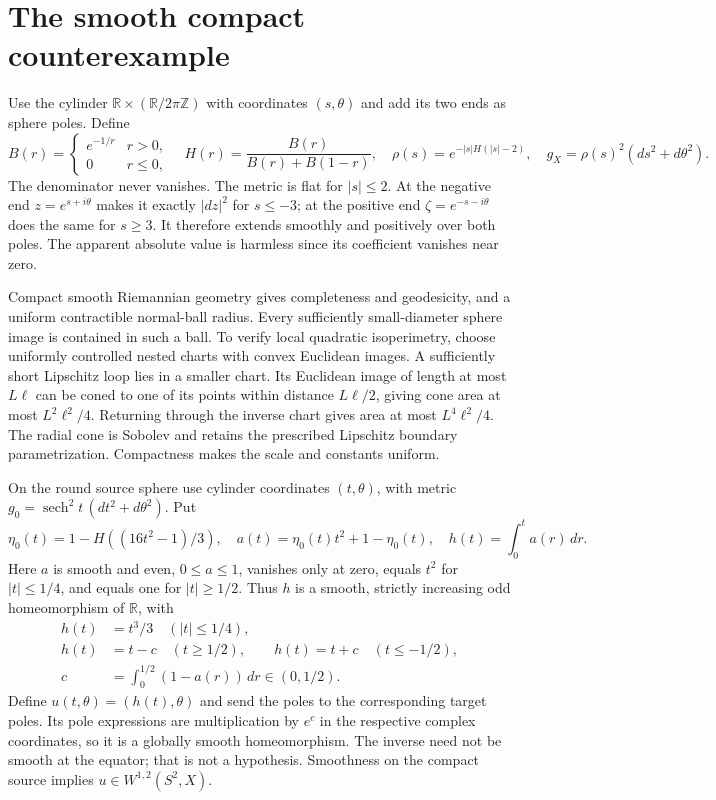 \documentclass[11pt]{article}
\newcommand{\R}{\mathbb R}
\begin{document}
\section{The smooth compact counterexample}
Use the cylinder $\R\times(\R/2\pi\mathbb Z)$ with coordinates $(s,\theta)$
and add its two ends as sphere poles. Define
\[
 B(r)=\begin{cases}e^{-1/r}&r>0,\\0&r\le0,\end{cases}
 \quad H(r)=\frac{B(r)}{B(r)+B(1-r)},\quad
 \rho(s)=e^{-|s|H(|s|-2)},\quad
 g_X=\rho(s)^2(ds^2+d\theta^2).
\]
The denominator never vanishes. The metric is flat for $|s|\le2$. At the
negative end $z=e^{s+i\theta}$ makes it exactly $|dz|^2$ for $s\le-3$;
at the positive end $\zeta=e^{-s-i\theta}$ does the same for $s\ge3$.
It therefore extends smoothly and positively over both poles. The apparent
absolute value is harmless since its coefficient vanishes near zero.

Compact smooth Riemannian geometry gives completeness and geodesicity, and a
uniform contractible normal-ball radius. Every sufficiently small-diameter
sphere image is contained in such a ball. To verify local quadratic isoperimetry,
choose uniformly controlled nested charts with convex Euclidean images.
A sufficiently short Lipschitz loop lies in a smaller chart. Its Euclidean
image of length at most $L\ell$ can be coned to one of its points within
distance $L\ell/2$, giving cone area at most $L^2\ell^2/4$. Returning through
the inverse chart gives area at most $L^4\ell^2/4$. The radial cone is Sobolev
and retains the prescribed Lipschitz boundary parametrization. Compactness
makes the scale and constants uniform.

On the round source sphere use cylinder coordinates $(t,\theta)$, with metric
$g_0=\operatorname{sech}^2t\,(dt^2+d\theta^2)$. Put
\[
 \eta_0(t)=1-H((16t^2-1)/3),\quad
 a(t)=\eta_0(t)t^2+1-\eta_0(t),\quad h(t)=\int_0^t a(r)\,dr.
\]
Here $a$ is smooth and even, $0\le a\le1$, vanishes only at zero, equals $t^2$
for $|t|\le1/4$, and equals one for $|t|\ge1/2$. Thus $h$ is a smooth,
strictly increasing odd homeomorphism of $\R$, with
\begin{align*}
 h(t)&=t^3/3\quad(|t|\le1/4),\\
 h(t)&=t-c\quad(t\ge1/2),\qquad h(t)=t+c\quad(t\le-1/2),\\
 c&=\int_0^{1/2}(1-a(r))\,dr\in(0,1/2).
\end{align*}
Define $u(t,\theta)=(h(t),\theta)$ and send the poles to the corresponding
target poles. Its pole expressions are multiplication by $e^c$ in the
respective complex coordinates, so it is a globally smooth homeomorphism.
The inverse need not be smooth at the equator; that is not a hypothesis.
Smoothness on the compact source implies $u\in W^{1,2}(S^2,X)$.
\end{document}
